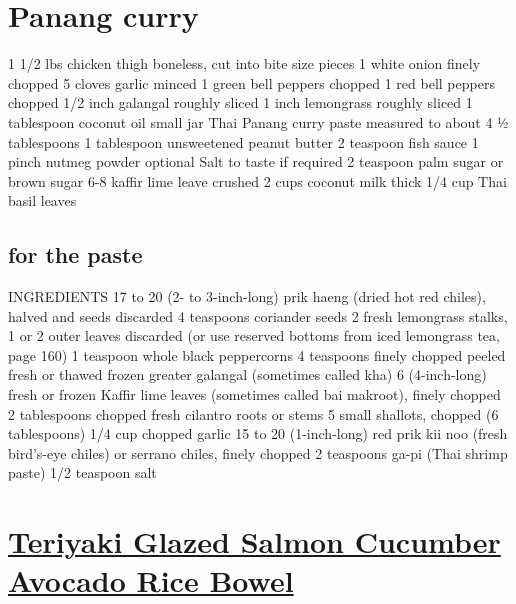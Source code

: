 \documentclass[
]{article}
\begin{document}
\hypertarget{panang-curry}{%
\section{Panang curry}\label{panang-curry}}

1 1/2 lbs chicken thigh boneless, cut into bite size pieces
1 white onion finely chopped
5 cloves garlic minced
1 green bell peppers chopped
1 red bell peppers chopped
1/2 inch galangal roughly sliced
1 inch lemongrass roughly sliced
1 tablespoon coconut oil small jar Thai Panang curry paste measured to about 4 ½ tablespoons
1 tablespoon unsweetened peanut butter
2 teaspoon fish sauce
1 pinch nutmeg powder optional
Salt to taste if required
2 teaspoon palm sugar or brown sugar
6-8 kaffir lime leave crushed
2 cups coconut milk thick
1/4 cup Thai basil leaves

\hypertarget{for-the-paste}{%
\subsection{for the paste}\label{for-the-paste}}

INGREDIENTS
17 to 20 (2- to 3-inch-long) prik haeng (dried hot red chiles), halved and seeds discarded
4 teaspoons coriander seeds
2 fresh lemongrass stalks, 1 or 2 outer leaves discarded (or use reserved bottoms from iced lemongrass tea, page 160)
1 teaspoon whole black peppercorns
4 teaspoons finely chopped peeled fresh or thawed frozen greater galangal (sometimes called kha)
6 (4-inch-long) fresh or frozen Kaffir lime leaves (sometimes called bai makroot), finely chopped
2 tablespoons chopped fresh cilantro roots or stems
5 small shallots, chopped (6 tablespoons)
1/4 cup chopped garlic
15 to 20 (1-inch-long) red prik kii noo (fresh bird's-eye chiles) or serrano chiles, finely chopped
2 teaspoons ga-pi (Thai shrimp paste)
1/2 teaspoon salt

\hypertarget{teriyaki-glazed-salmon-cucumber-avocado-rice-bowel}{%
\section{\texorpdfstring{\href{https://www.seriouseats.com/recipes/2016/07/easy-teriyaki-glazed-salmon-cucumber-avocado-rice-bowl-recipe.html}{Teriyaki Glazed Salmon Cucumber Avocado Rice Bowel}}{Teriyaki Glazed Salmon Cucumber Avocado Rice Bowel}}\label{teriyaki-glazed-salmon-cucumber-avocado-rice-bowel}}
\end{document}
